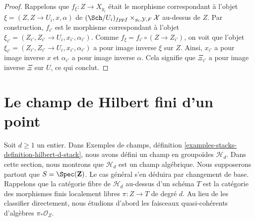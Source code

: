 \begin{proof}
Rappelons que $f_\xi : Z \to X_{y_i}$ était le morphisme correspondant à
l'objet $\xi = (Z, Z \to U_i, x, \alpha)$ de
$(\Sch/U_i)_{fppf} \times_{y_i, \mathcal{Y}, F} \mathcal{X}$
au-dessus de $Z$. Par construction, $f_{i'}$ est le morphisme correspondant à
l'objet $\xi_{i'} = (Z_{i'}, Z_{i'} \to U_i, x_{i'}, \alpha_{i'})$.
Comme $f_\xi = f_{i'} \circ (Z \to Z_{i'})$, on voit que
l'objet $\xi_{i'} = (Z_{i'}, Z_{i'} \to U_i, x_{i'}, \alpha_{i'})$ a pour image inverse
$\xi$ sur $Z$. Ainsi, $x_{i'}$ a pour image inverse $x$ et $\alpha_{i'}$
a pour image inverse $\alpha$. Cela signifie que $\Xi_{i'}$ a pour image inverse
$\Xi$ sur $U$, ce qui conclut.
\end{proof}










\section{Le champ de Hilbert fini d'un point}
\label{section-hilbert-point}

\noindent
Soit $d \geq 1$ un entier. Dans
Exemples de champs, définition \ref{examples-stacks-definition-hilbert-d-stack},
nous avons défini un champ en groupoïdes $\mathcal{H}_d$.
Dans cette section, nous montrons que $\mathcal{H}_d$ est un
champ algébrique. Nous supposerons partout que
$S = \Spec(\mathbf{Z})$.
Le cas général s'en déduira par changement de base.
Rappelons que la catégorie fibre de $\mathcal{H}_d$ au-dessus d'un schéma $T$
est la catégorie des morphismes finis localement libres $\pi : Z \to T$ de
degré $d$. Au lieu de les classifier directement, nous étudions d'abord
les faisceaux quasi-cohérents d'algèbres $\pi_*\mathcal{O}_Z$.

